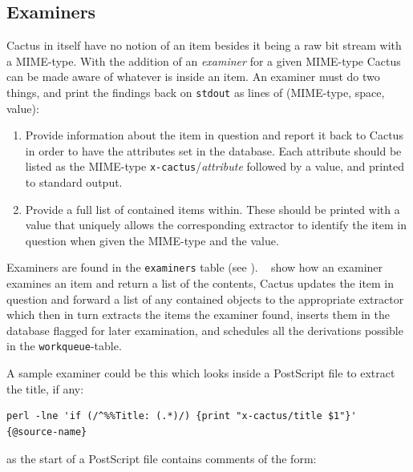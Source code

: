 \subsection{Examiners}

Cactus in itself have no notion of an item besides it being
a raw bit stream with a MIME-type.  With the addition of an
\textit{examiner} for a given MIME-type Cactus can be made
aware of whatever is inside an item.  An examiner must do
two things, and print the findings back on \texttt{stdout}
as lines of (MIME-type, space, value):

\begin{enumerate}
\item Provide information about the item in question and
  report it back to Cactus in order to have the attributes
  set in the database.  Each attribute should be listed as
  the MIME-type \texttt{x-cactus}/\textit{attribute}
  followed by a value, and printed to standard output.

\item Provide a full list of contained items within.  These
  should be printed with a value that uniquely allows the
  corresponding extractor to identify the item in question
  when given the MIME-type and the value.
\end{enumerate}


Examiners are found in the \texttt{examiners} table (see
).  ~ show how an examiner
examines an item and return a list of the contents, Cactus updates the
item in question and forward a list of any contained objects to the
appropriate extractor which then in turn extracts the items the examiner
found, inserts them in the database flagged for later examination, and
schedules all the derivations possible in the
\texttt{workqueue}-table.

A sample examiner could be this which looks inside a PostScript file
to extract the title, if any:

\begin{verbatim}
perl -lne 'if (/^%%Title: (.*)/) {print "x-cactus/title $1"}' {@source-name}
\end{verbatim}

as the start of a PostScript file contains comments of the form:

